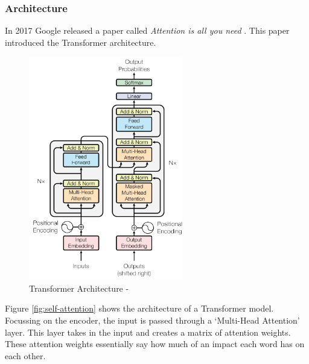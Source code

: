 \subsubsection{Architecture}
In 2017 Google released a paper called \textit{Attention is all you need} \cite{Attention}. This paper introduced the Transformer
architecture.
\begin{figure}
    \centering
    \includegraphics[width=0.6\textwidth]{../images/transformer.png}
    \caption{Transformer Architecture - \cite{attention}}
    \label{fig:transformer}
\end{figure}

Figure \ref{fig:self-attention} shows the architecture of a Transformer model. Focussing on the encoder, the input is passed through
a `Multi-Head Attention' layer. This layer takes in the input and creates a matrix of attention weights. These attention weights
essentially say how much of an impact each word has on each other.
